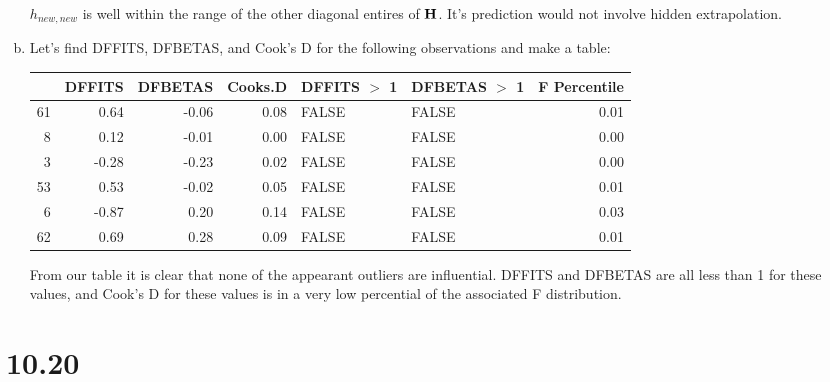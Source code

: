 \documentclass{article}
\begin{document}
\begin{enumerate}[a)]
$h_{new,new}$ is well within the range of the other diagonal entires of $\bf{H}$. It's prediction would not involve hidden extrapolation.

\item{} Let's find DFFITS, DFBETAS, and Cook's D for the following observations and make a table:
\begin{Schunk}
\begin{table}[ht]
\centering
\begin{tabular}{rrrrllr}
  \hline
 & DFFITS & DFBETAS & Cooks.D & DFFITS $>$ 1 & DFBETAS $>$ 1 & F Percentile \\ 
  \hline
61 & 0.64 & -0.06 & 0.08 & FALSE & FALSE & 0.01 \\ 
  8 & 0.12 & -0.01 & 0.00 & FALSE & FALSE & 0.00 \\ 
  3 & -0.28 & -0.23 & 0.02 & FALSE & FALSE & 0.00 \\ 
  53 & 0.53 & -0.02 & 0.05 & FALSE & FALSE & 0.01 \\ 
  6 & -0.87 & 0.20 & 0.14 & FALSE & FALSE & 0.03 \\ 
  62 & 0.69 & 0.28 & 0.09 & FALSE & FALSE & 0.01 \\ 
   \hline
\end{tabular}
\end{table}\end{Schunk}

From our table it is clear that none of the appearant outliers are influential. DFFITS and DFBETAS are all less than 1 for these values, and Cook's D for these values is in a very low percential of the associated F distribution.

\end{enumerate}

\section{10.20}
\end{document}
